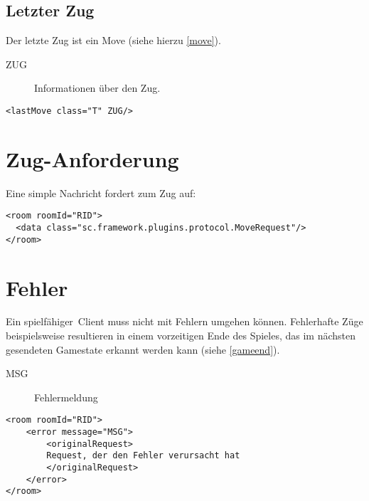 \documentclass[12pt,a4paper, ngerman, oneside]{scrartcl}
\begin{document}
\subsection{\label{lastmove}Letzter Zug}
Der letzte Zug ist ein Move (siehe hierzu \ref{move}).
\begin{description}
\item[ZUG] Informationen über den Zug.
\end{description}
\begin{verbatim}
<lastMove class="T" ZUG/>
\end{verbatim}

\section{\label{moverequest}Zug-Anforderung}
Eine simple Nachricht fordert zum Zug auf:
\begin{verbatim}
<room roomId="RID">
  <data class="sc.framework.plugins.protocol.MoveRequest"/>
</room>
\end{verbatim}

\section{Fehler}
Ein \glqq spielfähiger\grqq\ Client muss nicht mit Fehlern umgehen können.
Fehlerhafte Züge beispielsweise resultieren in einem vorzeitigen Ende des
Spieles, das im nächsten gesendeten Gamestate erkannt werden kann (siehe \ref{gameend}).
\begin{description}
\item[MSG] Fehlermeldung
\end{description}
\begin{verbatim}
<room roomId="RID">
	<error message="MSG">
		<originalRequest>
		Request, der den Fehler verursacht hat
		</originalRequest>
	</error>
</room>
\end{verbatim}
\end{document}
